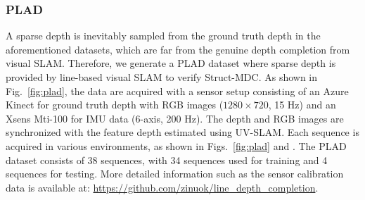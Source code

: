 \subsubsection{\textcolor{color1}{PLAD}}
\textcolor{color1}{A} sparse depth is inevitably sampled from the ground truth depth in the aforementioned datasets, which \textcolor{color1}{are} far from \textcolor{color1}{the} genuine depth completion from visual SLAM. Therefore, we \textcolor{color1}{generate} a PLAD dataset where sparse depth is provided by line-based visual SLAM to verify Struct-MDC.
As shown in Fig.~\ref{fig:plad}, the data \textcolor{color1}{are} acquired with a sensor setup consisting of \textcolor{color1}{an} Azure Kinect for ground truth depth with RGB images ($1280 \times 720$, 15 Hz) and \textcolor{color1}{an} Xsens Mti-100 for IMU data (6-axis, 200 Hz).
The depth and RGB images are synchronized with the feature depth estimated \textcolor{color1}{using} UV-SLAM. Each sequence is acquired in various environments, as shown in Figs.~\ref{fig:plad} and .
The PLAD \textcolor{color1}{dataset} consists of 38 sequences, with 34 sequences used for training and 4 sequences for testing. More detailed information \textcolor{color1}{such as the} sensor calibration data is available at: \url{https://github.com/zinuok/line_depth_completion}.



















